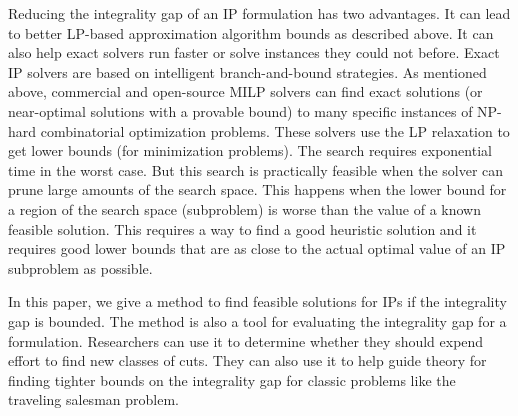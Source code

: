 Reducing the integrality gap of an IP formulation has two advantages.  It can lead to better LP-based approximation algorithm bounds as described above.  It can also help exact solvers run faster or solve instances they could not before. Exact IP solvers are based on intelligent branch-and-bound strategies.  As mentioned above, commercial and open-source MILP solvers can find exact solutions (or near-optimal solutions with a provable bound) to many specific instances of NP-hard combinatorial optimization problems. These solvers use the LP relaxation to get lower bounds (for minimization problems).  The search requires exponential time in the worst case. But this search is practically feasible when the solver can prune large amounts of the search space.  This happens when the lower bound for a region of the search space (subproblem) is worse than the value of a known feasible solution.  This requires a way to find a good heuristic solution and it requires good lower bounds that are as close to the actual optimal value of an IP subproblem as possible.

In this paper, we give a method to find feasible solutions for IPs if the integrality gap is bounded. The method is also a tool for evaluating the integrality gap for a formulation.  Researchers can use it to determine whether they should expend effort to find new classes of cuts.  They can also use it to help guide theory for finding tighter bounds on the integrality gap for classic problems like the traveling salesman problem.



